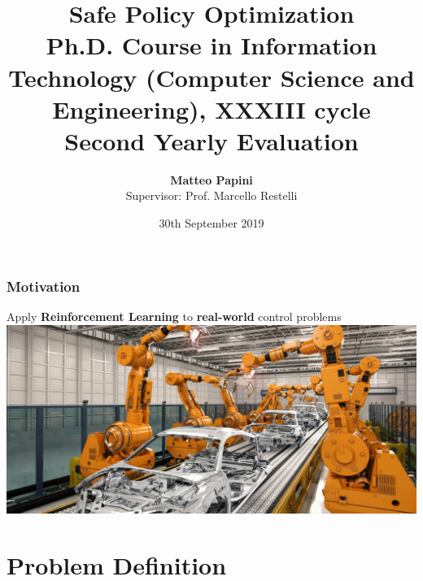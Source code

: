 \documentclass[aspectratio=169]{beamer}
\title[Safe Policy Optimization]{Safe Policy Optimization\\ \vspace{0.2cm}\small{Ph.D. Course in Information Technology (Computer Science and Engineering), XXXIII cycle} \\ Second Yearly Evaluation}
\date[AAA]{\vspace{0.2cm}  30th September 2019 }
\author[M. Papini]{\textbf{Matteo Papini} \\ Supervisor: Prof. Marcello Restelli}
\begin{document}
\begin{frame}
\titlepage
\end{frame}

\addtocounter{framenumber}{-1}

\begin{frame}
\frametitle{Motivation}
Apply \textbf{Reinforcement Learning} to \textbf{real-world} control problems
\vfill
\centering
\includegraphics[width=.85\textwidth]{pics/factory.jpg}
\end{frame}

\addtocounter{framenumber}{-1}
\begin{frame}[plain]
\tableofcontents
\end{frame}

\section{Problem Definition}
\addtocounter{framenumber}{-1}
\frame[plain]{\tableofcontents[currentsection]}
\end{document}
